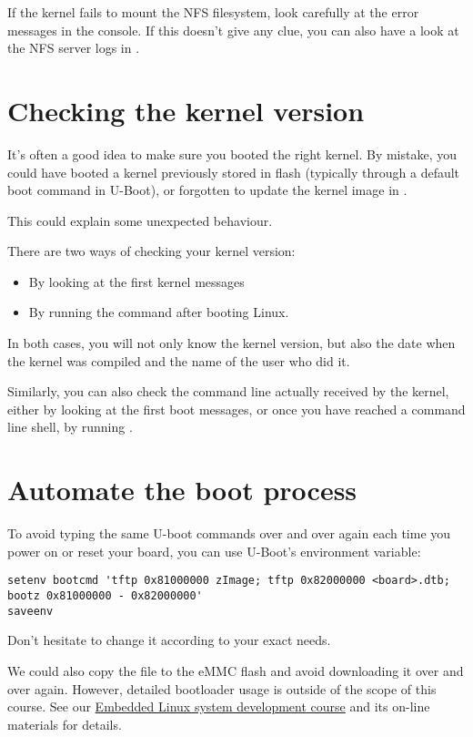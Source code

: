 If the kernel fails to mount the NFS filesystem, look carefully at the
error messages in the console. If this doesn't give any clue, you can
also have a look at the NFS server logs in .

\section{Checking the kernel version}

It's often a good idea to make sure you booted the right kernel.
By mistake, you could have booted a kernel previously stored in flash
(typically through a default boot command in U-Boot), or forgotten to 
update the kernel image in .

This could explain some unexpected behaviour.

There are two ways of checking your kernel version:
\begin{itemize}
\item By looking at the first kernel messages
\item By running the  command after booting Linux. 
\end{itemize}

In both cases, you will not only know the kernel version, but also
the date when the kernel was compiled and the name of the user who
did it.

Similarly, you can also check the command line actually received by
the kernel, either by looking at the first boot messages, or once you
have reached a command line shell, by running .

\section{Automate the boot process}

To avoid typing the same U-boot commands over and over again each time
you power on or reset your board, you can use U-Boot's 
environment variable:

{\scriptsize
\begin{verbatim}
setenv bootcmd 'tftp 0x81000000 zImage; tftp 0x82000000 <board>.dtb; bootz 0x81000000 - 0x82000000'
saveenv
\end{verbatim}
}

Don't hesitate to change it according to your exact needs.

We could also copy the  file to the eMMC flash and avoid
downloading it over and over again. However, detailed bootloader
usage is outside of the scope of this course. See our
\href{https://bootlin.com/training/embedded-linux/}{Embedded
Linux system development course} and its on-line materials for
details.
